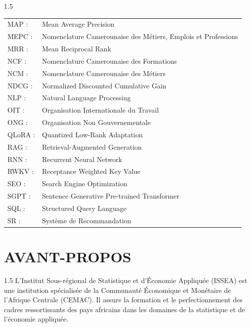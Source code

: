 \documentclass[12pt,twoside]{report}
\makeatletter
\let\OldListOfFigures\listoffigures
\renewcommand{\listoffigures}{%
  \begingroup
  \singlespacing
  \setlength{\parskip}{0pt}
  \renewcommand*\l@figure{\@dottedtocline{1}{1.5em}{6.4em}}%
  \let\OldNumberLine\numberline
  \renewcommand{\numberline}[1]{\OldNumberLine{Figure~##1}}%
  \OldListOfFigures
  \endgroup
}
\let\OldListOfTables\listoftables
\renewcommand{\listoftables}{%
  \begingroup
  \singlespacing
  \setlength{\parskip}{0pt}
  \renewcommand*\l@table{\@dottedtocline{1}{1.5em}{6.8em}}%
  \let\OldNumberLine\numberline
  \renewcommand{\numberline}[1]{\OldNumberLine{Tableau~##1}}%
  \OldListOfTables
  \endgroup
}
\makeatother
\begin{document}
\begin{singlespace}
\begin{spacing}{1.5}
{\newpage
\noindent\begin{tabularx}{\textwidth}{@{}p{2.5cm}X@{}}
MAP : & Mean Average Precision \\
MEPC : & Nomenclature Camerounaise des Métiers, Emplois et Professions \\
MRR : & Mean Reciprocal Rank \\
NCF : & Nomenclature Camerounaise des Formations \\
NCM : & Nomenclature Camerounaise des Métiers \\
NDCG : & Normalized Discounted Cumulative Gain \\
NLP : & Natural Language Processing \\
OIT : & Organisation Internationale du Travail \\
ONG : & Organisation Non Gouvernementale \\
QLoRA : & Quantized Low-Rank Adaptation \\
RAG : & Retrieval-Augmented Generation \\
RNN : & Recurrent Neural Network \\
RWKV : & Receptance Weighted Key Value \\
SEO : & Search Engine Optimization \\
SGPT : & Sentence Generative Pre-trained Transformer \\
SQL : & Structured Query Language \\
SR : & Système de Recommandation \\
\end{tabularx}
}
\end{spacing}

\vspace{0.2cm}

\listoftables
{}

\listoffigures
{}


\chapter*{AVANT-PROPOS}
\begin{spacing}{1.5}
L'Institut Sous-régional de Statistique et d'Économie Appliquée (ISSEA) est une institution spécialisée de la Communauté Économique et Monétaire de l'Afrique Centrale (CEMAC). Il assure la formation et le perfectionnement des cadres ressortissants des pays africains dans les domaines de la statistique et de l'économie appliquée.


\end{spacing}
\end{singlespace}
\end{document}
